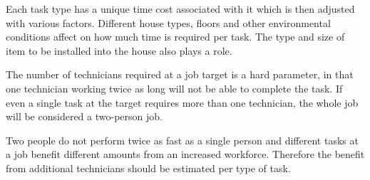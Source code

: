 Each task type has a unique time cost associated with it which is then adjusted with various factors. Different house types, floors and other environmental conditions affect on how much time is required per task. The type and size of item to be installed into the house also plays a role. 

The number of technicians required at a job target is a hard parameter, in that one technician working twice as long will not be able to complete the task. If even a single task at the target requires more than one technician, the whole job will be considered a two-person job. 

Two people do not perform twice as fast as a single person and different tasks at a job benefit different amounts from an increased workforce. Therefore the benefit from additional technicians should be estimated per type of task. 



